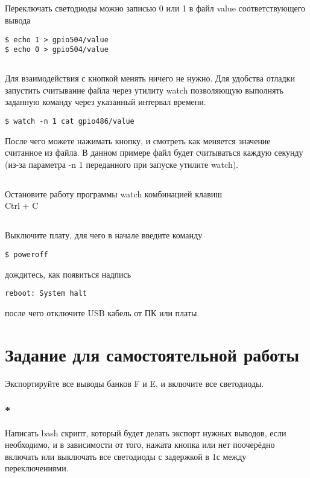 \subsection{}Переключать светодиоды можно записью 0 или 1 в файл value соответствующего вывода
\begin{lstlisting}[style=bash]
$ echo 1 > gpio504/value
$ echo 0 > gpio504/value
\end{lstlisting}

\subsection{}Для взаимодействия с кнопкой менять ничего не нужно. Для удобства отладки запустить считывание файла через утилиту watch позволяющую выполнять заданную команду через указанный интервал времени.

\begin{lstlisting}[style=bash]
$ watch -n 1 cat gpio486/value
\end{lstlisting}

После чего можете нажимать кнопку, и смотреть как меняется значение считанное из файла. В данном примере файл будет считываться каждую секунду (из-за параметра -n 1 переданного при запуске утилите watch).  

\subsection{}Остановите работу программы watch комбинацией клавиш \\ Ctrl + C

\subsection{} Выключите плату, для чего в начале введите команду
\begin{lstlisting}[style=bash]
	$ poweroff
\end{lstlisting}
дождитесь, как появиться надпись
\begin{lstlisting}[style=stdout]
	reboot: System halt
\end{lstlisting}
после чего отключите USB кабель от ПК или платы. 

\section{Задание для самостоятельной работы}
Экспортируйте все выводы банков F и E, и включите все светодиоды.

\subsubsection{*} Написать bash скрипт, который будет делать экспорт нужных выводов, если необходимо, и в зависимости от того, нажата кнопка или нет поочерёдно включать или выключать все светодиоды с задержкой в 1с между переключениями. 